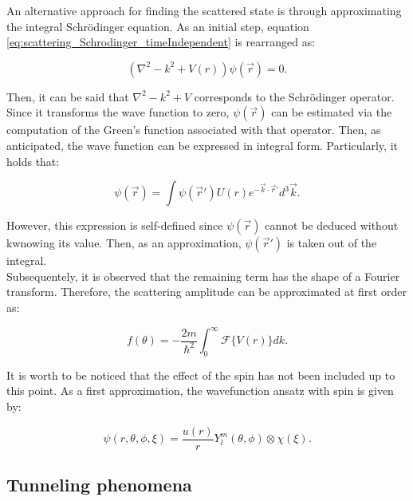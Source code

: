 \documentclass[openany]{book}
\begin{document}
An alternative approach for finding the scattered state is through approximating the integral Schrödinger equation. As an initial step, equation \ref{eq:scattering_Schrodinger_timeIndependent} is rearranged as:

\begin{equation} \label{eq:bornApproximation_operator}
 	(\nabla^2  - k^2 + V(r))\psi(\vec r) = 0.
\end{equation}

Then, it can be said that $\nabla^2  - k^2 + V$ corresponds to the Schrödinger operator. Since it transforms the wave function to zero,  $\psi(\vec r)$ can be estimated via the computation of the Green's function associated with that operator. Then, as anticipated, the wave function can be expressed in integral form. Particularly, it holds that:

 \begin{equation} \label{eq:bornApproximation_operator}
 	\psi(\vec r) = \int{ \psi(\vec r' )U(r)e^{-\vec k \cdot \vec r'} d^3 \vec k}. 
 \end{equation}

However, this expression is self-defined since $\psi(\vec r) $ cannot be deduced without kwnowing its value. Then, as an approximation, $\psi(\vec r') $ is taken out of the integral.  \\

Subsequentely, it is observed that the remaining term has the shape of a Fourier transform. Therefore, the scattering amplitude can be approximated at first order as:

\begin{equation} \label{eq:bornApproximation_scatteringAmplitude}
	f(\theta) =   - \frac{2m}{\hbar^2} \int_{0}^{\infty} {\mathcal{F}\{V(r)\}dk}.
\end{equation}

It is worth to be noticed that the effect of the spin has not been included up to this point. As a first approximation, the 
wavefunction ansatz with spin is given by:

\begin{equation} \label{eq:scattering_waveFunction}
	\psi(r, \theta, \phi, \xi) = \frac{u(r)}{r} Y_{l}^{m}(\theta, \phi) \otimes \chi(\xi).
\end{equation}


\subsection{Tunneling phenomena} \label{sub:tunnelingPhenomena}
\end{document}

